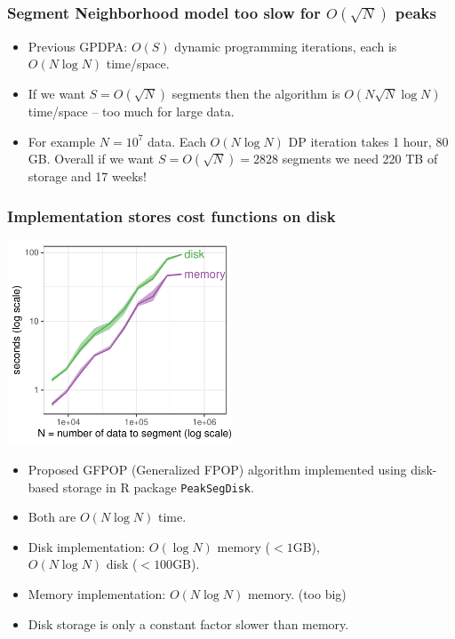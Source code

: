 \documentclass[t]{beamer}
\begin{document}
\begin{frame}
  \frametitle{Segment Neighborhood model too slow for $O(\sqrt N)$ peaks }
  
  \vskip -0.4cm
  \begin{itemize} 
  \item %
    Previous GPDPA: $O(S)$ dynamic programming iterations,
    each is $O(N\log N)$ time/space.
  \item If we want $S=O(\sqrt{N})$ segments then the algorithm is
    $O(N \sqrt N \log N)$ time/space -- too much for large data.
  \item For example $N=10^7$ data. Each $O(N\log N)$ DP iteration
    takes 1 hour, 80 GB. Overall if we want $S=O(\sqrt N) = 2828$
    segments we need 220 TB of storage and 17 weeks!
  \end{itemize}
\end{frame}

\begin{frame}
  \frametitle{Implementation stores cost functions on disk}

  \includegraphics[width=0.5\textwidth]{jss-figure-disk-memory-compare-speed}

  \begin{itemize}
  \item Proposed GFPOP (Generalized FPOP) algorithm implemented using disk-based storage
    in R package \texttt{PeakSegDisk}.
  \item Both are $O(N\log N)$ time.
  \item Disk implementation: $O(\log N)$ memory ($<1$GB),\\
    $O(N\log N)$ disk ($<100$GB).
  \item Memory implementation: $O(N \log N)$ memory. (too big)
  \item Disk storage is only a constant factor slower than memory.
  \end{itemize}

\end{frame}
\end{document}
